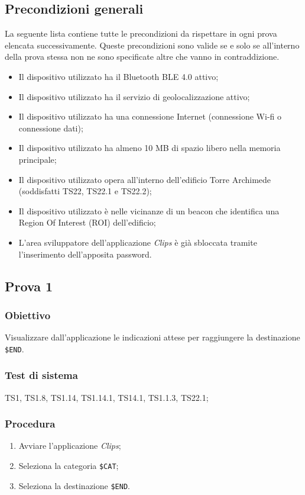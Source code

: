 \documentclass[../SperimentazioniPratiche.tex]{subfiles}
\begin{document}
\subsection{Precondizioni generali}
	La seguente lista contiene tutte le precondizioni da rispettare in ogni prova elencata successivamente. Queste precondizioni sono valide se e solo se all'interno della prova stessa non ne sono specificate altre che vanno in contraddizione.
	\begin{itemize}
		\item Il dispositivo utilizzato ha il Bluetooth BLE 4.0 attivo;
		\item Il dispositivo utilizzato ha il servizio di geolocalizzazione attivo;
		\item Il dispositivo utilizzato ha una connessione Internet (connessione Wi-fi o connessione dati);
		\item Il dispositivo utilizzato ha almeno 10 MB di spazio libero nella memoria principale;
		\item Il dispositivo utilizzato opera all'interno dell'edificio Torre Archimede (soddisfatti TS22, TS22.1 e TS22.2);
		\item Il dispositivo utilizzato è nelle vicinanze di un beacon che identifica una Region Of Interest (ROI) dell'edificio;
		\item L'area sviluppatore dell'applicazione \textit{Clips} è già sbloccata tramite l'inserimento dell'apposita password.
	\end{itemize}



\newpage
\subsection{Prova 1} %
\label{subsec:Prova1}	
	
	\subsubsection{Obiettivo}
		Visualizzare dall'applicazione le indicazioni attese per raggiungere la destinazione \verb|$END|.
		
	\subsubsection{Test di sistema}
		TS1, TS1.8,
		TS1.14, TS1.14.1,
		TS14.1,
		TS1.1.3,
		TS22.1;
		
	\subsubsection{Procedura}
		\begin{enumerate}
		\item Avviare l'applicazione \textit{Clips};
		\item Seleziona la categoria  \verb|$CAT|;
		\item Seleziona la destinazione  \verb|$END|.
		\end{enumerate}
	
\end{document}
